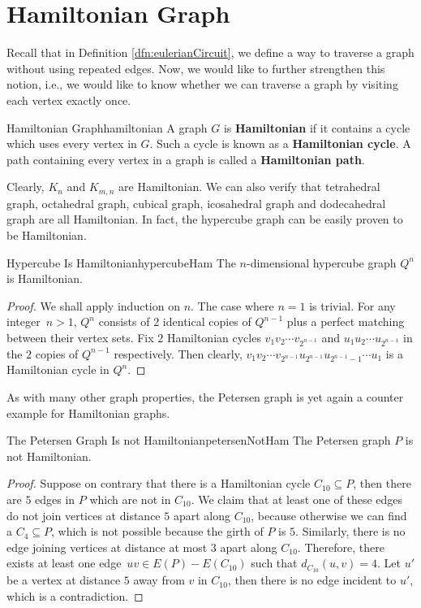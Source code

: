 \documentclass[math]{amznotes}
\theoremstyle{remark}
\newcommand{\0}{\mathbf{0}}
\newcommand{\1}{\mathbf{1}}
\begin{document}
\section{Hamiltonian Graph}
Recall that in Definition \ref{dfn:eulerianCircuit}, we define a way to traverse a graph without using repeated edges. Now, we would like to further strengthen this notion, i.e., we would like to know whether we can traverse a graph by visiting each vertex exactly once.
\begin{dfnbox}{Hamiltonian Graph}{hamiltonian}
    A graph $G$ is {\color{red} \textbf{Hamiltonian}} if it contains a cycle which uses every vertex in $G$. Such a cycle is known as a {\color{red} \textbf{Hamiltonian cycle}}. A path containing every vertex in a graph is called a {\color{red} \textbf{Hamiltonian path}}.
\end{dfnbox}
Clearly, $K_n$ and $K_{m, n}$ are Hamiltonian. We can also verify that tetrahedral graph, octahedral graph, cubical graph, icosahedral graph and dodecahedral graph are all Hamiltonian. In fact, the hypercube graph can be easily proven to be Hamiltonian.
\begin{probox}{Hypercube Is Hamiltonian}{hypercubeHam}
    The $n$-dimensional hypercube graph $Q^n$ is Hamiltonian.
    \tcblower
    \begin{proof}
        We shall apply induction on $n$. The case where $n = 1$ is trivial. For any integer~$n > 1$, $Q^n$ consists of $2$ identical copies of $Q^{n - 1}
        $ plus a perfect matching between their vertex sets. Fix $2$ Hamiltonian cycles $v_1v_2\cdots v_{2^{n - 1}}$ and $u_1u_2\cdots u_{2^{n - 1}}$ in the $2$ copies of $Q^{n - 1}$ respectively. Then clearly, $v_1v_2\cdots v_{2^{n - 1}}u_{2^{n - 1}}u_{2^{n - 1} - 1}\cdots u_1$ is a Hamiltonian cycle in $Q^n$.
    \end{proof}
\end{probox}
As with many other graph properties, the Petersen graph is yet again a counter example for Hamiltonian graphs.
\begin{probox}{The Petersen Graph Is not Hamiltonian}{petersenNotHam}
    The Petersen graph $P$ is not Hamiltonian.
    \tcblower
    \begin{proof}
        Suppose on contrary that there is a Hamiltonian cycle $C_{10} \subseteq P$, then there are $5$ edges in $P$ which are not in $C_{10}$. We claim that at least one of these edges do not join vertices at distance $5$ apart along $C_{10}$, because otherwise we can find a $C_4 \subseteq P$, which is not possible because the girth of $P$ is $5$. Similarly, there is no edge joining vertices at distance at most $3$ apart along $C_{10}$. Therefore, there exists at least one edge~$uv \in E(P) - E(C_{10})$ such that $d_{C_{10}}(u, v) = 4$. Let $u'$ be a vertex at distance $5$ away from $v$ in $C_{10}$, then there is no edge incident to $u'$, which is a contradiction.
    \end{proof}
\end{probox}
\end{document}
